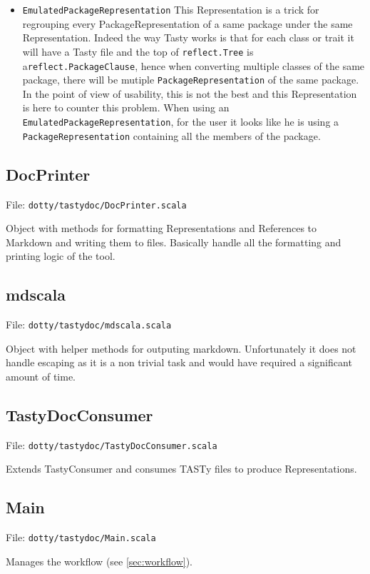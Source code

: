 \documentclass{report}
\begin{document}
\begin{itemize}
\begin{lstlisting}[language=scala]
\end{lstlisting}
    \item \texttt{EmulatedPackageRepresentation} This Representation is a trick for regrouping every PackageRepresentation of a same package under the same Representation. Indeed the way Tasty works is that for each class or trait it will have a Tasty file and the top of \texttt{reflect.Tree} is a\texttt{reflect.PackageClause}, hence when converting multiple classes of the same package, there will be mutiple \texttt{PackageRepresentation} of the same package. In the point of view of usability, this is not the best and this Representation is here to counter this problem. When using an \texttt{EmulatedPackageRepresentation}, for the user it looks like he is using a \texttt{PackageRepresentation} containing all the members of the package.
\end{itemize}

\subsection{DocPrinter}
File: \texttt{dotty/tastydoc/DocPrinter.scala}

Object with methods for formatting Representations and References to Markdown and writing them to files. Basically handle all the formatting and printing logic of the tool.

\subsection{mdscala}
File: \texttt{dotty/tastydoc/mdscala.scala}

Object with helper methods for outputing markdown. Unfortunately it does not handle escaping as it is a non trivial task and would have required a significant amount of time.

\subsection{TastyDocConsumer}
File: \texttt{dotty/tastydoc/TastyDocConsumer.scala}

Extends TastyConsumer and consumes TASTy files to produce Representations.

\subsection{Main}
File: \texttt{dotty/tastydoc/Main.scala}

Manages the workflow (see \autoref{sec:workflow}).
\end{document}
